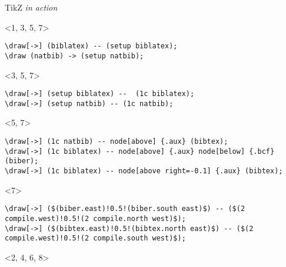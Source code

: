 \documentclass[main.tex]{subfiles}
\begin{document}
\begin{frame}[fragile]{TikZ \textit{in action}}
    \begin{onlyenv}%
        <1, 3, 5, 7>
        \begin{verbatim}
\draw[->] (biblatex) -- (setup biblatex);
\draw (natbib) -> (setup natbib);
        \end{verbatim}
    \end{onlyenv}

    \begin{onlyenv}%
        <3, 5, 7>
        \begin{verbatim}
\draw[->] (setup biblatex) --  (1c biblatex);
\draw[->] (setup natbib) -- (1c natbib);
        \end{verbatim}
    \end{onlyenv}

    \begin{onlyenv}%
        <5, 7>
        \begin{verbatim}
\draw[->] (1c natbib) -- node[above] {.aux} (bibtex);
\draw[->] (1c biblatex) -- node[above] {.aux} node[below] {.bcf} (biber);
\draw[->] (1c biblatex) -- node[above right=-0.1] {.aux} (bibtex);
        \end{verbatim}
    \end{onlyenv}

    \begin{onlyenv}%
    <7>
        \begin{verbatim}
\draw[->] ($(biber.east)!0.5!(biber.south east)$) -- ($(2 compile.west)!0.5!(2 compile.north west)$);
\draw[->] ($(bibtex.east)!0.5!(bibtex.north east)$) -- ($(2 compile.west)!0.5!(2 compile.south west)$);
        \end{verbatim}
    \end{onlyenv}

    \begin{onlyenv}%
        <2, 4, 6, 8>
        \begin{center}
            \advance\leftskip-25pt
            \vspace{-18pt}
            \def\colorSetup{ForestGreen}
            \def\colorCompile{VioletRed}
            \def\colorBackend{DeepSkyBlue}

            \begin{tikzpicture}
                [
                block/.style={rectangle, draw, minimum height=1cm, minimum width=2cm, align=center, thick},
                init/.style={initial by arrow, initial text=},
                arrow/.style={->,>=stealth},
                every initial by arrow/.style=arrow,
                every accepting by arrow/.style=arrow,
                ]


\end{tikzpicture}
\end{center}
\end{onlyenv}
\end{frame}
\end{document}
